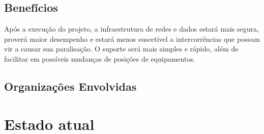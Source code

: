 \documentclass[	DIV=calc,%
							paper=a4,%
							fontsize=12pt,%
							onecolumn]{scrartcl}	 					%
\begin{document}
\subsection{Benefícios}
Após a execução do projeto, a infraestrutura de redes e dados estará mais segura, proverá maior desempenho e estará menos suscetível a intercorrências que possam vir a causar sua paralisação. O suporte será mais simples e rápido, além de facilitar em possíveis mudanças de posições de equipamentos.

\subsection{Organizações Envolvidas}



\section{Estado atual}

\end{document}
